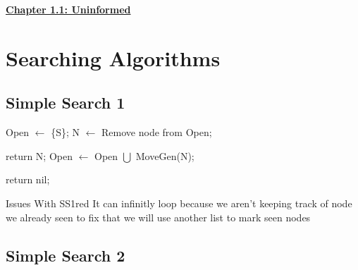 \newpage
\null
\begin{center}
    \Huge{\textbf{\underline{Chapter 1.1: Uninformed}}}
\end{center}

\setcounter{section}{0}

\vspace{0.35cm}
\section{Searching Algorithms}

\subsection{Simple Search 1}

\begin{algorithm}[ht]
\caption{SS1}
\begin{algorithmic}
\State Open \(\gets\) \{S\};
\vspace{0.1cm}
\State N \(\gets\) Remove node from Open;

\vspace{0.07cm}
\State return N;
\Else
\State Open \(\gets\) Open \(\bigcup\) MoveGen(N);
\EndIf

\vspace{0.07cm}
\EndWhile

\vspace{0.1cm}
\State return nil;
\end{algorithmic}
\end{algorithm}

\vspace{0.35cm}
\begin{prettyBox}{Issues With SS1}{red}
It can infinitly loop because we aren't keeping track
of node we already seen to fix that we will use another list
to mark seen nodes
\end{prettyBox}

\vspace{0.75cm}
\subsection{Simple Search 2}

